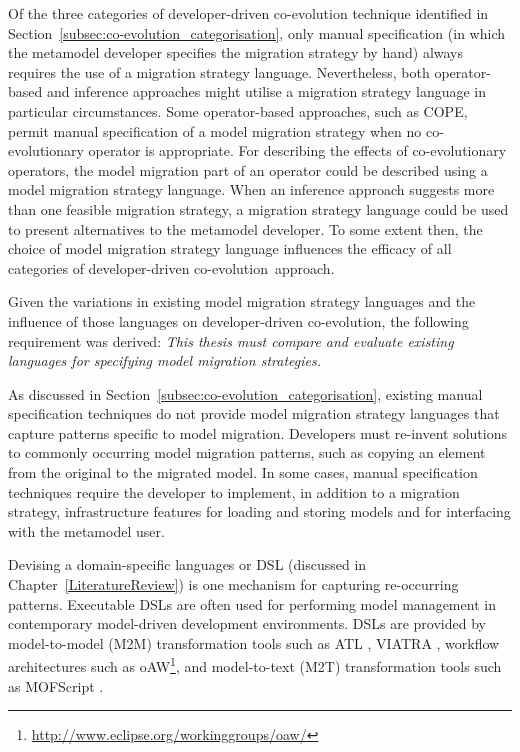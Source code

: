 Of the three categories of developer-driven co-evolution technique identified in Section~\ref{subsec:co-evolution_categorisation}, only manual specification (in which the metamodel developer specifies the migration strategy by hand) always requires the use of a migration strategy language. Nevertheless, both operator-based and inference approaches might utilise a migration strategy language in particular circumstances. Some operator-based approaches, such as COPE, permit manual specification of a model migration strategy when no co-evolutionary operator is appropriate. For describing the effects of co-evolutionary operators, the model migration part of an operator could be described using a model migration strategy language. When an inference approach suggests more than one feasible migration strategy, a migration strategy language could be used to present alternatives to the metamodel developer. To some extent then, the choice of model migration strategy language influences the efficacy of all categories of developer-driven co-evolution approach.  

Given the variations in existing model migration strategy languages and the influence of those languages on developer-driven co-evolution, the following requirement was derived: \emph{This thesis must compare and evaluate existing languages for specifying model migration strategies.}

As discussed in Section~\ref{subsec:co-evolution_categorisation}, existing manual specification techniques do not provide model migration strategy languages that capture patterns specific to model migration. Developers must re-invent solutions to commonly occurring model migration patterns, such as copying an element from the original to the migrated model. In some cases, manual specification techniques require the developer to implement, in addition to a migration strategy, infrastructure features for loading and storing models and for interfacing with the metamodel user. 

Devising a domain-specific languages or DSL (discussed in Chapter~\ref{LiteratureReview}) is one mechanism for capturing re-occurring patterns. Executable DSLs are often used for performing model management in contemporary model-driven development environments. DSLs are provided by model-to-model (M2M) transformation tools such as ATL \cite{jouault05transforming}, VIATRA \cite{VIATRA}, workflow architectures such as oAW\footnote{\url{http://www.eclipse.org/workinggroups/oaw/}}, and model-to-text (M2T) transformation tools such as MOFScript \cite{oldevik05toward}.

